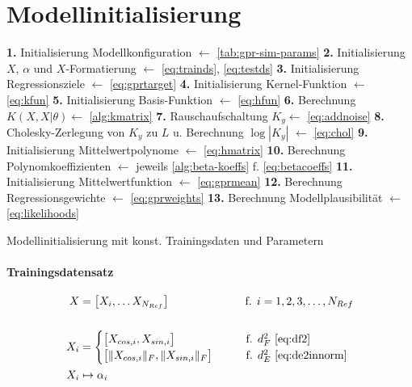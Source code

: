 \clearpage



\section{Modellinitialisierung}\label{sec:gprinit}


\begin{algorithm}[bhp]
	\SetAlgoLined
	\textbf{1.} Initialisierung Modellkonfiguration $\leftarrow$ \autoref{tab:gpr-sim-params}\;
	\textbf{2.} Initialisierung $X$, $\alpha$ und $X$-Formatierung $\leftarrow$ \autoref{eq:trainds}, \autoref{eq:testds}\;
	\textbf{3.} Initialisierung Regressionsziele $\leftarrow$ \autoref{eq:gprtarget}\;
	\textbf{4.} Initialisierung Kernel-Funktion $\leftarrow$ \autoref{eq:kfun}\;
	\textbf{5.} Initialisierung Basis-Funktion $\leftarrow$ \autoref{eq:hfun}\;
	\textbf{6.} Berechnung $K(X,X|\theta) \leftarrow$ \autoref{alg:kmatrix}\;
	\textbf{7.} Rauschaufschaltung $K_y \leftarrow$ \autoref{eq:addnoise}\;
	\textbf{8.} Cholesky-Zerlegung von $K_y$ zu $L$ u. Berechnung $\log |K_y|$ $\leftarrow$ \autoref{eq:chol}\;
	\textbf{9.} Initialisierung Mittelwertpolynome $\leftarrow$ \autoref{eq:hmatrix}\;
	\textbf{10.} Berechnung Polynomkoeffizienten $\leftarrow$ jeweils \autoref{alg:beta-koeffs} f. \autoref{eq:betacoeffs}\;
	\textbf{11.} Initialisierung Mittelwertfunktion $\leftarrow$ \autoref{eq:gprmean}\;
	\textbf{12.} Berechnung Regressionsgewichte $\leftarrow$ \autoref{eq:gprweights}\;
	\textbf{13.} Berechnung Modellplausibilität $\leftarrow$ \autoref{eq:likelihoods}\;
	\caption{Modellinitialisierung mit konst. Trainingsdaten und Parametern}
	\label{alg:gprinit}
\end{algorithm}


\clearpage


\paragraph*{Trainingsdatensatz}


\begin{align}\label{eq:trainds}
	X   &= \big[ X_i, \ldots X_{N_{Ref}} \big] \qquad\qquad\qquad\quad\!  \text{f. } i = 1,2,3,\ldots,N_{Ref} \nonumber \\
	\\
	X_i &= 
		\begin{cases}
			\big[ X_{cos,i}, X_{sin,i} \big]             &\qquad \text{f. } d_F^2 \text{ \eqref{eq:df2}} \\
			\big[ \|X_{cos,i}\|_F, \|X_{sin,i}\|_F \big] &\qquad \text{f. } d_E^2 \text{ \eqref{eq:de2innorm}}
		\end{cases} \nonumber \\
	X_i & \mapsto \alpha_i \nonumber
\end{align}


